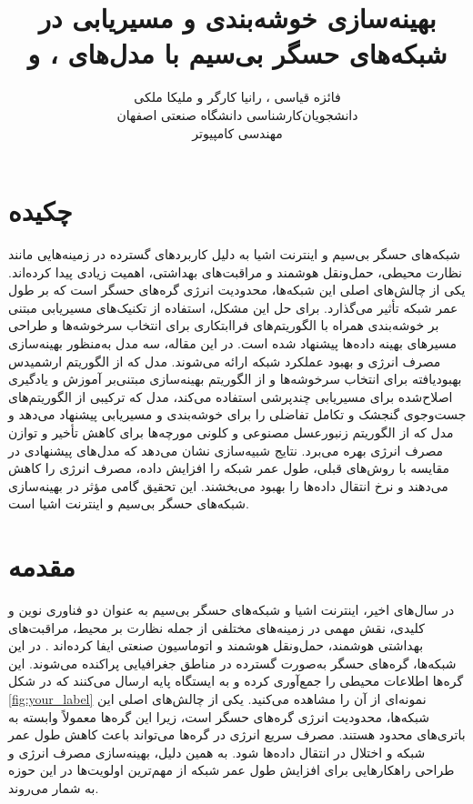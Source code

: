 \documentclass[11.5pt, onecolumn, a4paper]{article}
\begin{document}
	
	\title{بهینه‌سازی خوشه‌بندی و مسیر‌یابی در شبکه‌های حسگر بی‌سیم با مدل‌های ،  و } 
	\author{فائزه قیاسی ، رانیا کارگر و ملیکا ملکی\\
		دانشجویان‌کارشناسی دانشگاه صنعتی اصفهان\\
		مهندسی کامپیوتر}
	\date{}
	\maketitle
	\thispagestyle{empty}
	\vfill
\section*{چکیده}
شبکه‌های حسگر بی‌سیم و اینترنت اشیا به دلیل کاربردهای گسترده در زمینه‌هایی مانند نظارت محیطی، حمل‌ونقل هوشمند و مراقبت‌های بهداشتی، اهمیت زیادی پیدا کرده‌اند. یکی از چالش‌های اصلی این شبکه‌ها، محدودیت انرژی گره‌های حسگر است که بر طول عمر شبکه تأثیر می‌گذارد. برای حل این مشکل، استفاده از تکنیک‌های مسیریابی مبتنی بر خوشه‌بندی همراه با الگوریتم‌های فراابتکاری برای انتخاب سرخوشه‌ها و طراحی مسیرهای بهینه داده‌ها پیشنهاد شده است. در این مقاله، سه مدل به‌منظور بهینه‌سازی مصرف انرژی و بهبود عملکرد شبکه ارائه می‌شوند. مدل  که از الگوریتم ارشمیدس بهبودیافته برای انتخاب سرخوشه‌ها و از الگوریتم بهینه‌سازی مبتنی‌بر آموزش و یادگیری اصلاح‌شده برای مسیریابی چندپرشی استفاده می‌کند، مدل  که ترکیبی از الگوریتم‌های جست‌وجوی گنجشک و تکامل تفاضلی را برای خوشه‌بندی و مسیریابی پیشنهاد می‌دهد و مدل  که از الگوریتم زنبورعسل مصنوعی و کلونی مورچه‌ها برای کاهش تأخیر و توازن مصرف انرژی بهره می‌برد. نتایج شبیه‌سازی نشان می‌دهد که مدل‌های پیشنهادی در مقایسه با روش‌های قبلی، طول عمر شبکه را افزایش داده، مصرف انرژی را کاهش می‌دهند و نرخ انتقال داده‌ها را بهبود می‌بخشند. این تحقیق گامی مؤثر در بهینه‌سازی شبکه‌های حسگر بی‌سیم و اینترنت اشیا است.

	\clearpage
	\newpage
\section{مقدمه}
در سال‌های اخیر، اینترنت اشیا و شبکه‌های حسگر بی‌سیم به عنوان دو فناوری نوین و کلیدی، نقش مهمی در زمینه‌های مختلفی از جمله نظارت بر محیط، مراقبت‌های بهداشتی هوشمند، حمل‌ونقل هوشمند و اتوماسیون صنعتی ایفا کرده‌اند \cite{ref1, ref2, ref3}. در این شبکه‌ها، گره‌های حسگر به‌صورت گسترده در مناطق جغرافیایی پراکنده می‌شوند. این گره‌ها اطلاعات محیطی را جمع‌آوری کرده و به ایستگاه پایه ارسال می‌کنند که در شکل \ref{fig:your_label} نمونه‌ای از آن را مشاهده می‌کنید. یکی از چالش‌های اصلی این شبکه‌ها، محدودیت انرژی گره‌های حسگر است، زیرا این گره‌ها معمولاً وابسته به باتری‌های محدود هستند. مصرف سریع انرژی در گره‌ها می‌تواند باعث کاهش طول عمر شبکه و اختلال در انتقال داده‌ها شود. به همین دلیل، بهینه‌سازی مصرف انرژی و طراحی راهکارهایی برای افزایش طول عمر شبکه از مهم‌ترین اولویت‌ها در این حوزه به شمار می‌روند.
\end{document}
